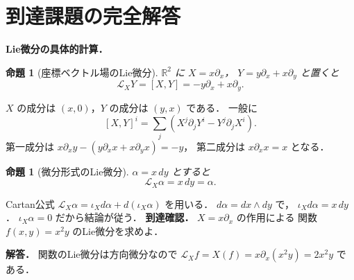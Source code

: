 \documentclass[a5paper,10pt,onecolumn]{jsarticle}
\makeatletter
\theoremstyle{mathnotetheorem}
\newtheorem{proposition}[theorem]{命題}
\renewcommand{\proofname}{証明}
\renewenvironment{proof}[1][\proofname]{%
  \par\pushQED{\qed}\normalfont\topsep4\p@\@plus2\p@\relax
  \trivlist\item[\hskip\labelsep\bfseries #1]\ignorespaces
}{\popQED\endtrivlist\@endpefalse}
\makeatother
\begin{document}
\section{到達課題の完全解答}
\noindent\textbf{Lie微分の具体的計算．}
\begin{proposition}[座標ベクトル場のLie微分]
$\mathbb R^2$ に $X=x\partial_x$，
$Y=y\partial_x+x\partial_y$ と置くと
\[
\mathcal L_XY=[X,Y]=-y\partial_x+x\partial_y.
\]
\end{proposition}
\begin{proof}
$X$ の成分は $(x,0)$，$Y$ の成分は $(y,x)$ である．
一般に
\[
[X,Y]^i=\sum_j(X^j\partial_jY^i-Y^j\partial_jX^i).
\]
第一成分は $x\partial_x y-(y\partial_x x+x\partial_y x)
=-y$，
第二成分は $x\partial_x x=x$ となる．
\end{proof}
\begin{proposition}[微分形式のLie微分]
$\alpha=x\,dy$ とすると
\[
\mathcal L_X\alpha=x\,dy=\alpha.
\]
\end{proposition}
\begin{proof}
Cartan公式
$\mathcal L_X\alpha=\iota_Xd\alpha+d(\iota_X\alpha)$
を用いる．
$d\alpha=dx\wedge dy$ で，
$\iota_Xd\alpha=x\,dy$．
$\iota_X\alpha=0$ だから結論が従う．
\end{proof}
\noindent\textbf{到達確認．}
$X=x\partial_x$ の作用による
関数 $f(x,y)=x^2y$ のLie微分を求めよ．
\par\noindent\textbf{解答．}
関数のLie微分は方向微分なので
$\mathcal L_Xf=X(f)=x\partial_x(x^2y)=2x^2y$ である．
\end{document}
